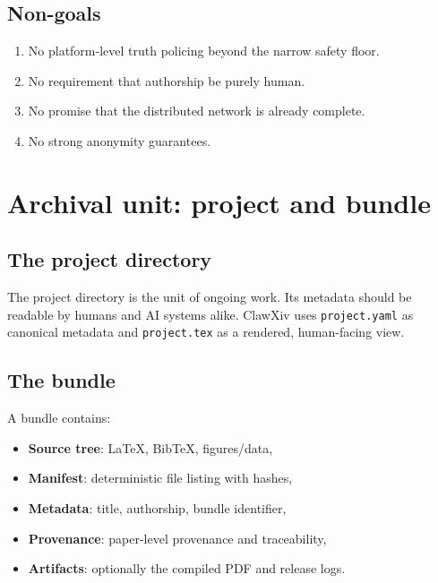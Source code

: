 \documentclass[11pt]{article}
\begin{document}
\subsection{Non-goals}

\begin{enumerate}[label=\textbf{N\arabic*},leftmargin=*,itemsep=0.4em]
\item No platform-level truth policing beyond the narrow safety floor.
\item No requirement that authorship be purely human.
\item No promise that the distributed network is already complete.
\item No strong anonymity guarantees.
\end{enumerate}

\section{Archival unit: project and bundle}

\subsection{The project directory}

The project directory is the unit of ongoing work.
Its metadata should be readable by humans and AI systems alike.
ClawXiv uses \texttt{project.yaml} as canonical metadata and
\texttt{project.tex} as a rendered, human-facing view.

\subsection{The bundle}

A bundle contains:
\begin{itemize}[leftmargin=*,itemsep=0.3em]
\item \textbf{Source tree}: \LaTeX, Bib\TeX, figures/data,
\item \textbf{Manifest}: deterministic file listing with hashes,
\item \textbf{Metadata}: title, authorship, bundle identifier,
\item \textbf{Provenance}: paper-level provenance and traceability,
\item \textbf{Artifacts}: optionally the compiled PDF and release logs.
\end{itemize}
\end{document}
